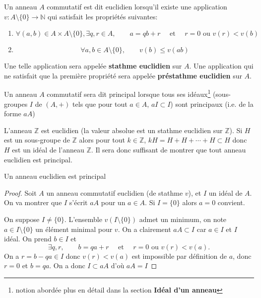 \begin{dfn}
    Un anneau $A$ commutatif est dit euclidien lorsqu'il existe une application $v:A\setminus\{0\} \to \mathbb N$ qui satisfait les propriétés suivantes:
    \begin{enumerate}
        \item \[
                \forall (a, b)\in A\times A\setminus\{0\}, \exists q, r\in A, \qquad a=qb+r\quad \text{ et } \quad r=0\text{ ou } v(r)<v(b)
            \]
        \item \[
                \forall a, b\in A\setminus\{0\}, \qquad v(b)\leq v(ab)
            \]
    \end{enumerate}
    Une telle application sera appelée \textbf{stathme euclidien} sur $A$. Une application qui ne satisfait que la première propriété sera appelée \textbf{préstathme euclidien} sur $A$.

    Un anneau $A$ commutatif sera dit principal lorsque tous ses idéaux\footnote{notion abordée plus en détail dans la section \textbf{Idéal d'un anneau}} (sous-groupes $I$ de $(A, +)$ tels que pour tout $a\in A$, $aI\subset I$) sont principaux (i.e. de la forme $aA$)
\end{dfn}

L'anneau $\mathbb Z$ est euclidien (la valeur absolue est un stathme euclidien sur $\mathbb Z$). Si $H$ est un sous-groupe de $\mathbb Z$ alors pour tout $k\in\mathbb Z$, $kH=H+H+\cdots +H\subset H$ donc $H$ est un idéal de l'anneau $\mathbb Z$. Il sera donc suffisant de montrer que tout anneau euclidien est principal.

\begin{prop}
    Un anneau euclidien est principal
\end{prop}

\begin{proof}
    Soit $A$ un anneau commutatif euclidien (de stathme $v$), et $I$ un idéal de $A$. On va montrer que $I$ s'écrit $aA$ pour un $a\in A$. Si $I=\{0\}$ alors $a=0$ convient.

    On suppose $I\neq \{0\}$. L'ensemble $v(I\setminus\{0\})$ admet un minimum, on note $a\in I\setminus\{0\}$ un élément minimal pour $v$. On a clairement $aA\subset I$ car $a\in I$ et $I$ idéal. On prend $b\in I$ et \[
        \exists q, r, \qquad b=qa+r\quad \text{ et }\quad r=0\text{ ou }v(r)<v(a).
    \]
    On a $r=b-qa\in I$ donc $v(r)<v(a)$ est impossible par définition de $a$, donc $r=0$ et $b=qa$. On a donc $I\subset aA$ d'où $aA=I$
\end{proof}

